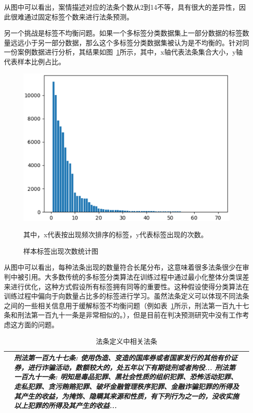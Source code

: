 从图中可以看出，案情描述对应的法条个数从2到14不等，具有很大的差异性，因此很难通过固定标签个数来进行法条预测。

另一个挑战是标签不均衡问题。如果一个多标签分类数据集上一部分数据的标签数量远远小于另一部分数据，那么这个多标签分类数据集被认为是不均衡的。针对同一份案例数据进行分析，其结果如图~\ref{fig:tail}所示，其中，x轴代表法条集合大小，y轴代表样本比例占比。

\begin{figure}[htb]
\centering
\includegraphics[scale=0.5,clip=true]{./sources/dpam_statistic2.eps}
\caption{\label{fig:tail}样本标签出现次数统计图}
其中，x代表按出现频次排序的标签，y代表标签出现的次数。
\end{figure}


从图中可以看出，每种法条出现的数量符合长尾分布，这意味着很多法条很少在审判中被引用。大多数传统的多标签分类算法在训练过程中通过最小化整体分类误差来进行优化，这种方式假设所有标签拥有同等的重要性。这种假设使得分类算法在训练过程中偏向于向数量占比多的标签进行学习。虽然法条定义可以体现不同法条之间的一些相关信息用于缓解标签不均衡问题（例如表~\ref{t:relevant_article}所示，刑法第一百九十七条和刑法第一百九十一条是非常相似的。），但是目前在判决预测研究中没有工作考虑这方面的问题。
\begin{table}[htb]
    \caption{法条定义中相关法条}
    \label{t:relevant_article}
    \centering
    \begin{tabular}{lp{12cm}p{8cm}}
    \hline
    &\emph{\textbf{刑法第一百九十七条}: 使用伪造、变造的国库券或者国家发行的其他有价证券，进行\emph{\textbf{诈骗}}活动，数额较大的，处五年以下有期徒刑或者拘役... \newline
    \textbf{刑法第一百九十一条}: 明知是毒品犯罪、黑社会性质的组织犯罪、恐怖活动犯罪、走私犯罪、贪污贿赂犯罪、破坏金融管理秩序犯罪、\emph{\textbf{金融诈骗}}犯罪的所得及其产生的收益，为掩饰、隐瞒其来源和性质，有下列行为之一的，没收实施以上犯罪的所得及其产生的收益...}\\
    \hline
    \end{tabular}
\end{table}

